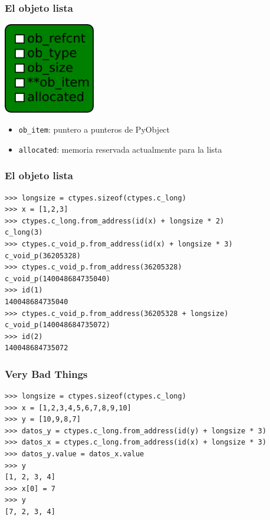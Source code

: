 \documentclass[10pt]{beamer}
\begin{document}
  \begin{frame}[containsverbatim]
    \frametitle{El objeto lista}
    \begin{center}\includegraphics[width=4cm]{img/List.png}\end{center}
    \begin{itemize}
      \item \verb+ob_item+: puntero a punteros de PyObject
      \item \verb+allocated+: memoria reservada actualmente para la lista
    \end{itemize}
  \end{frame}

  \begin{frame}[containsverbatim]
    \frametitle{El objeto lista}
    \begin{verbatim}
>>> longsize = ctypes.sizeof(ctypes.c_long)
>>> x = [1,2,3]
>>> ctypes.c_long.from_address(id(x) + longsize * 2)
c_long(3)
>>> ctypes.c_void_p.from_address(id(x) + longsize * 3)
c_void_p(36205328)
>>> ctypes.c_void_p.from_address(36205328)
c_void_p(140048684735040)
>>> id(1)
140048684735040
>>> ctypes.c_void_p.from_address(36205328 + longsize)
c_void_p(140048684735072)
>>> id(2)
140048684735072
    \end{verbatim}
  \end{frame}

  \begin{frame}[containsverbatim]
    \frametitle{Very Bad Things}
    \begin{verbatim}
>>> longsize = ctypes.sizeof(ctypes.c_long)
>>> x = [1,2,3,4,5,6,7,8,9,10]
>>> y = [10,9,8,7]
>>> datos_y = ctypes.c_long.from_address(id(y) + longsize * 3)
>>> datos_x = ctypes.c_long.from_address(id(x) + longsize * 3)
>>> datos_y.value = datos_x.value
>>> y
[1, 2, 3, 4]
>>> x[0] = 7
>>> y
[7, 2, 3, 4]
    \end{verbatim}
  \end{frame}
\end{document}
